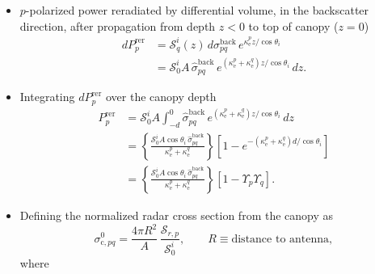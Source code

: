 \documentclass[11pt, oneside]{article}
\newcommand{\ke}[1]{\kappa_\mathrm{e}^{#1}}
\newcommand{\sback}{\hat{\sigma}^\mathrm{back}_{pq}}
\begin{document}
\begin{itemize}
	\item $p$-polarized power reradiated by differential volume, in the backscatter direction, after propagation from depth $z<0$ to top of canopy ($z=0$)
	\begin{align}
		dP_p^\mathrm{rer} &= \mathcal{S}_q^i(z)\,d\sigma^\mathrm{back}_{pq}\,e^{\ke{p}z/\cos\theta_i} \nonumber\\
		&= \mathcal{S}_0^i A\,\sback\,e^{(\ke{p}+\ke{q})z/\cos\theta_i}\,dz. \label{e:dP}
	\end{align}
	\item Integrating $dP_p^\mathrm{rer}$ over the canopy depth
	\begin{align}
		P_p^\mathrm{rer} &= \mathcal{S}_0^i A\int_{-d}^0 \sback\,e^{(\ke{p}+\ke{q})z/\cos\theta_i}\,dz \nonumber\\
		&= \left\{\frac{\mathcal{S}_0^iA\cos\theta_i\,\sback}{\ke{p}+\ke{q}}\right\}\left[1 - e^{-(\ke{p}+\ke{q})d/\cos\theta_i}\right] \nonumber\\
		&= \left\{\frac{\mathcal{S}_0^iA\cos\theta_i\,\sback}{\ke{p}+\ke{q}}\right\}\left[1 - \Upsilon_p\Upsilon_q\right]. \label{e:P}
	\end{align}
	\item Defining the normalized radar cross section from the canopy as
	\begin{equation}
		\label{e:sc_def}
		\sigma^0_{\mathrm{c},pq} = \frac{4\pi R^2}{A}\,\frac{\mathcal{S}_{r,p}}{\mathcal{S}_0^i}, \qquad R \equiv \text{distance to antenna},
	\end{equation}
	where
	\begin{equation*}

\end{equation*}
\end{itemize}
\end{document}
